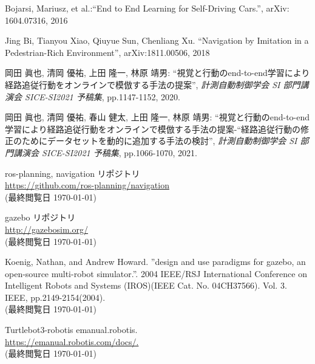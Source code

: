 \documentclass{ujarticle}
\begin{document}
\footnotesize
\begin{thebibliography}{99}

Bojarsi, Mariusz, et al.:``End to End Learning for Self-Driving Cars.'', arXiv: 1604.07316, 2016

Jing Bi, Tianyou Xiao, Qiuyue Sun, Chenliang Xu. ``Navigation by Imitation in a Pedestrian-Rich Environment'', 	arXiv:1811.00506, 2018

岡田 眞也, 清岡 優祐, 上田 隆一, 林原 靖男: ``視覚と行動のend-to-end学習により経路追従行動をオンラインで模倣する手法の提案'', \textit{計測自動制御学会 SI 部門講演会 SICE-SI2021 予稿集}, pp.1147-1152, 2020.

岡田 眞也, 清岡 優祐, 春山 健太, 上田 隆一, 林原 靖男: ``視覚と行動のend-to-end学習により経路追従行動をオンラインで模倣する手法の提案-“経路追従行動の修正のためにデータセットを動的に追加する手法の検討'', \textit{計測自動制御学会 SI 部門講演会 SICE-SI2021 予稿集}, pp.1066-1070, 2021.


ros-planning, navigation リポジトリ\\
\url{https://github.com/ros-planning/navigation}\\
(最終閲覧日 \today)

gazebo リポジトリ\\
\url{http://gazebosim.org/}\\
(最終閲覧日 \today)

Koenig, Nathan, and Andrew Howard. ”design and use paradigms for gazebo, an open-source multi-robot simulator.”. 2004 IEEE/RSJ International Conference on Intelligent Robots and Systems (IROS)(IEEE Cat. No. 04CH37566). Vol. 3. IEEE, pp.2149-2154(2004).\\
(最終閲覧日 \today)

Turtlebot3-robotis emanual.robotis.\\
\url{https://emanual.robotis.com/docs/.}\\
(最終閲覧日 \today)

\end{thebibliography}

\normalsize
\end{document}
